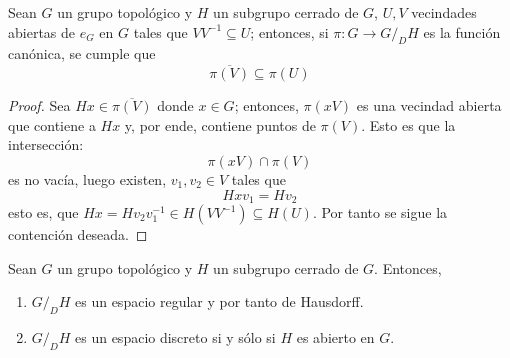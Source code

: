 \documentclass[12pt]{report}
\theoremstyle{largebreak}
\newcommand{\cf}[3]{\ensuremath{#1:#2\rightarrow#3}}
\newcommand{\Cls}[1]{\ensuremath{\overline{#1}}}
\begin{document}
    \begin{lema}
        Sean $G$ un grupo topológico y $H$ un subgrupo cerrado de $G$, $U,V$ vecindades abiertas de $e_G$ en $G$ tales que $VV^{-1}\subseteq U$; entonces, si $\cf{\pi}{G}{G/_DH}$ es la función canónica, se cumple que
        \begin{equation*}
            \Cls{\pi(V)}\subseteq\pi(U)
        \end{equation*}
    \end{lema}

    \begin{proof}
        Sea $Hx\in\Cls{\pi(V)}$ donde $x\in G$; entonces, $\pi(xV)$ es una vecindad abierta que contiene a $Hx$ y, por ende, contiene puntos de $\pi(V)$. Esto es que la intersección:
        \begin{equation*}
            \pi(xV)\cap\pi(V)
        \end{equation*}
        es no vacía, luego existen, $v_1,v_2\in V$ tales que
        \begin{equation*}
            Hxv_1=Hv_2
        \end{equation*}
        esto es, que $Hx=Hv_2v_1^{-1}\in H(VV^{-1})\subseteq H(U)$. Por tanto se sigue la contención deseada.
    \end{proof}

    \begin{theor}
        Sean $G$ un grupo topológico y $H$ un subgrupo cerrado de $G$. Entonces,
        \begin{enumerate}
            \item $G/_DH$ es un espacio regular y por tanto de Hausdorff.
            \item $G/_DH$ es un espacio discreto si y sólo si $H$ es abierto en $G$.
        \end{enumerate}
    \end{theor}
\end{document}
